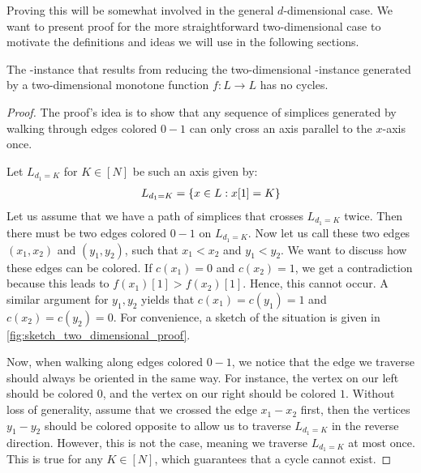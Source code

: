 Proving this will be somewhat involved in the general $d$-dimensional case. We want to present proof for the more straightforward two-dimensional case to motivate the definitions and ideas we will use in the following sections.

\begin{proposition}
	The \EndOfLine-instance that results from reducing the two-dimensional \Sperner-instance generated by a two-dimensional monotone function $f : L \rightarrow L$ has no cycles.
\end{proposition}
\begin{proof}
	The proof's idea is to show that any sequence of simplices generated by walking through edges colored $0 - 1$ can only cross an axis parallel to the $x$-axis once.

	Let $L_{d_1= K}$ for $K \in [N]$ be such an axis given by:
	\begin{align*}
		L_{d_1=K} = \left\{x \in L : x[1] = K\right\}
	\end{align*}
	Let us assume that we have a path of simplices that crosses $L_{d_1 = K}$ twice. Then there must be two edges colored $0 - 1$ on $L_{d_1=K}$. Now let us call these two edges $(x_1, x_2)$ and $(y_1, y_2)$, such that $x_1 < x_2$ and $y_1 < y_2$. We want to discuss how these edges can be colored. If $c(x_1) = 0$ and $c(x_2) = 1$, we get a contradiction because this leads to $f(x_1)[1] > f(x_2)[1]$. Hence, this cannot occur. A similar argument for $y_1, y_2$ yields that $c(x_1) = c(y_1) =1$ and $c(x_2) = c(y_2) = 0$. For convenience, a sketch of the situation is given in \cref{fig:sketch_two_dimensional_proof}.

	Now, when walking along edges colored $0 - 1$, we notice that the edge we traverse should always be oriented in the same way. For instance, the vertex on our left should be colored $0$, and the vertex on our right should be colored $1$. Without loss of generality, assume that we crossed the edge $x_1 - x_2$ first, then the vertices $y_1 - y_2$ should be colored opposite to allow us to traverse $L_{d_1=K}$ in the reverse direction. However,  this is not the case, meaning we traverse $L_{d_1=K}$ at most once. This is true for any $K \in [N]$, which guarantees that a cycle cannot exist.
\end{proof}
\begin{marginfigure}[-30mm]
	\caption{Sketch of the setting for the two-dimensional proof}\label{fig:sketch_two_dimensional_proof}
\end{marginfigure}

